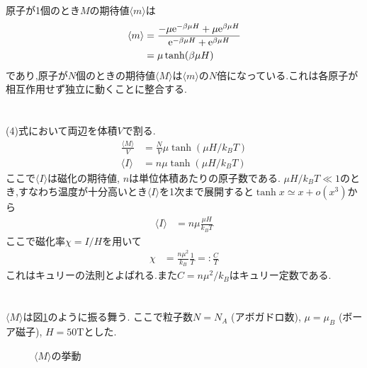 \documentclass[uplatex,a4j,11pt,dvipdfmx]{jsarticle}
\begin{document}
\section{}
原子が1個のとき$M$の期待値$\langle m\rangle$は
\begin{align*}
  \langle m\rangle&=\frac{-\mu{\rm e}^{-\beta\mu H}+\mu{\rm e}^{\beta\mu H}}{{\rm e}^{-\beta\mu H}+{\rm e}^{\beta\mu H}}\\
  &=\mu\tanh(\beta\mu H)
\end{align*}
であり,原子が$N$個のときの期待値$\langle M\rangle$は$\langle m\rangle$の$N$倍になっている.これは各原子が相互作用せず独立に動くことに整合する.
\section{}
(4)式において両辺を体積$V$で割る.
\begin{align*}
  \frac{\langle M\rangle}{V}&=\frac{N}{V}\mu\tanh(\mu H/k_BT)\\
  \langle I\rangle&=n\mu\tanh(\mu H/k_BT)
\end{align*}
ここで$\langle I\rangle$は磁化の期待値, $n$は単位体積あたりの原子数である.
$\mu H/k_BT \ll 1$のとき,すなわち温度が十分高いとき$\langle I\rangle$を1次まで展開すると$\tanh x\simeq x+o(x^3)$から
\begin{align*}
  \langle I\rangle&=n\mu\frac{\mu H}{k_BT}
\end{align*}
ここで磁化率$\chi=I/H$を用いて
\begin{align*}
  \chi&=\frac{n\mu^2}{k_B}\frac{1}{T}=:\frac{C}{T}
\end{align*}
これはキュリーの法則とよばれる.また$C=n\mu^2/k_B$はキュリー定数である.
\clearpage
\section{}
$\langle M\rangle$は図\ref{fig:M}のように振る舞う.
ここで粒子数$N=N_A$ (アボガドロ数), $\mu=\mu_B$ (ボーア磁子), $H=50\si{\tesla}$とした.
\begin{figure}[hptb]
\begin{center}

\caption{$\langle M\rangle$の挙動}
\label{fig:M}
\end{center}
\end{figure}
\end{document}
